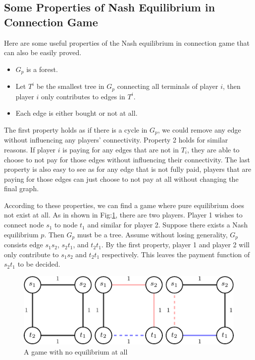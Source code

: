 \documentclass[11pt,psfig,times]{article}
\begin{document}
\subsection{Some Properties of Nash Equilibrium in Connection Game}
Here are some useful properties of the Nash equilibrium in connection game that can also be easily proved. 
\begin{itemize}
	\item \(G_p\) is a forest.
	\item Let \(T^i\) be the smallest tree in \(G_p\) connecting all terminals of player \(i\), then player \(i\) only contributes to edges in \(T^i\).
	\item Each edge is either bought or not at all. 
\end{itemize}
The first property holds as if there is a cycle in $G_p$, we could remove any edge without influencing any players' connectivity. Property 2 holds for similar reasons. If player $i$ is paying for any edges that are not in $T_i$, they are able to choose to not pay for those edges without influencing their connectivity. The last property is also easy to see as for any edge that is not fully paid, players that are paying for those edges can just choose to not pay at all without changing the final graph. 

According to these properties, we can find a game where pure equilibrium does not exist at all. As in shown in Fig:\ref{fig:noequi}, there are two players. Player 1 wishes to connect node $s_1$ to node $t_1$ and similar for player 2. Suppose there exists a Nash equilibrium $p$. Then $G_p$ must be a tree. Assume without losing generality, $G_p$ consists edge $s_1s_2$, $s_2t_1$, and $t_2t_1$. By the first property, player 1 and player 2 will only contribute to $s_1s_2$ and $t_2t_1$ respectively. This leaves the payment function of $s_2t_1$ to be decided. 

\begin{figure}[H]
	\begin{center}
	\includegraphics{pictures/noequi.pdf}
	\end{center}
	\caption{A game with no equilibrium at all}
	\label{fig:noequi}
\end{figure}
\end{document}
